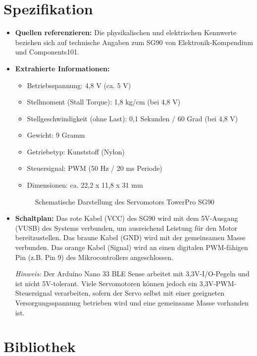 \section{Spezifikation}
\begin{itemize}
	\item \textbf{Quellen referenzieren:} Die physikalischen und elektrischen Kennwerte beziehen sich auf technische Angaben zum SG90 von Elektronik-Kompendium und Components101.\cite{Elektronik:2026,Components101:2017}
	\item \textbf{Extrahierte Informationen:}
	\begin{itemize}
		\item Betriebsspannung: 4,8 V (ca. 5 V)
		\item Stellmoment (Stall Torque): 1,8 kg/cm (bei 4,8 V)
		\item Stellgeschwindigkeit (ohne Last): 0,1 Sekunden / 60 Grad (bei 4,8 V)
		\item Gewicht: 9 Gramm
		\item Getriebetyp: Kunststoff (Nylon)
		\item Steuersignal: PWM (50 Hz / 20 ms Periode)
		\item Dimensionen: ca. 22,2 x 11,8 x 31 mm 
	\end{itemize}
	
	\begin{figure}[htbp]
		\centering
		
		\caption{Schematische Darstellung des Servomotors TowerPro SG90}
		\label{fig:sg90_tikz}
	\end{figure}
	
	\item \textbf{Schaltplan:} Das rote Kabel (VCC) des SG90 wird mit dem 5V-Ausgang (VUSB) des Systems verbunden, um ausreichend Leistung für den Motor bereitzustellen. Das braune Kabel (GND) wird mit der gemeinsamen Masse verbunden. Das orange Kabel (Signal) wird an einen digitalen PWM-fähigen Pin (z.B. Pin 9) des Mikrocontrollers angeschlossen.\cite{Elektronik:2026} 
	
	\textit{Hinweis:} Der Arduino Nano 33 BLE Sense arbeitet mit 3,3V-I/O-Pegeln und ist nicht 5V-tolerant.\cite{ArduinoNano:2026} 
	Viele Servomotoren können jedoch ein 3,3V-PWM-Steuersignal verarbeiten, sofern der Servo selbst mit einer geeigneten Versorgungsspannung betrieben wird und eine gemeinsame Masse vorhanden ist.\cite{Dr}
\end{itemize}

\section{Bibliothek}


